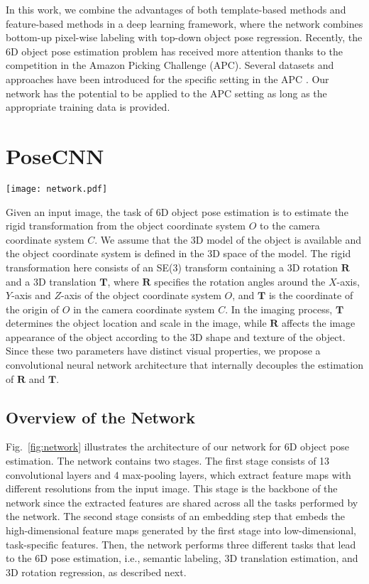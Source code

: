 \documentclass[conference]{IEEEtran}
\begin{document}
In this work, we combine the advantages of both template-based methods and feature-based methods in a deep learning framework, where the network combines bottom-up pixel-wise labeling with top-down object pose regression. Recently, the 6D object pose estimation problem has received more attention thanks to the competition in the Amazon Picking Challenge (APC). Several datasets and approaches have been introduced for the specific setting in the APC \cite{rennie2016dataset,zeng2017multi}. Our network has the potential to be applied to the APC setting as long as the appropriate training data is provided.

\section{PoseCNN}

\begin{figure*}
	\centering
	\texttt{[image: network.pdf]}
	\caption{Architecture of PoseCNN for 6D object pose estimation.}
	\label{fig:network}
	\vspace{-4mm}
\end{figure*}

Given an input image, the task of 6D object pose estimation is to estimate the rigid transformation from the object coordinate system $O$ to the camera coordinate system $C$. We assume that the 3D model of the object is available and the object coordinate system is defined in the 3D space of the model. The rigid transformation here consists of an SE(3) transform containing a 3D rotation $\mathbf{R}$ and a 3D translation $\mathbf{T}$, where $\mathbf{R}$ specifies the rotation angles around the $X$-axis, $Y$-axis and $Z$-axis of the object coordinate system $O$, and $\mathbf{T}$ is the coordinate of the origin of $O$ in the camera coordinate system $C$.
In the imaging process, $\mathbf{T}$ determines the object location and scale in the image, while $\mathbf{R}$ affects the image appearance of the object according to the 3D shape and texture of the object. Since these two parameters have distinct visual properties, we propose a convolutional neural network architecture that internally decouples the estimation of $\mathbf{R}$ and $\mathbf{T}$.

\subsection{Overview of the Network}

Fig.~\ref{fig:network} illustrates the architecture of our network for 6D object pose estimation. The network contains two stages. The first stage consists of 13 convolutional layers and 4 max-pooling layers, which extract feature maps with different resolutions from the input image. This stage is the backbone of the network since the extracted features are shared across all the tasks performed by the network. The second stage consists of an embedding step that embeds the high-dimensional feature maps generated by the first stage into low-dimensional,  task-specific features. Then, the network performs three different tasks that lead to the 6D pose estimation, i.e., semantic labeling, 3D translation estimation, and 3D rotation regression, as described next.
\end{document}
